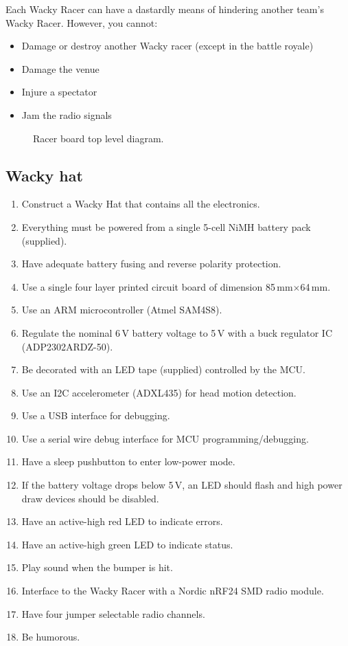 \documentclass[11pt, a4paper]{article}
\begin{document}
Each Wacky Racer can have a dastardly means of hindering another
team's Wacky Racer.  However, you cannot:
%
\begin{itemize}
\item Damage or destroy another Wacky racer (except in the battle royale)
\item Damage the venue
\item Injure a spectator
\item Jam the radio signals
\end{itemize}


\vspace{1cm}

\begin{figure}[h]
    \centering
    
    \caption{Racer board top level diagram.}
\end{figure}


\vfill\pagebreak

\subsection{Wacky hat}


\begin{enumerate}
\item Construct a Wacky Hat that contains all the electronics.
\item Everything must be powered from a single 5-cell NiMH battery pack (supplied).
\item Have adequate battery fusing and reverse polarity protection.
\item Use a single four layer printed circuit board of dimension 85\,mm$\times$64\,mm.
\item Use an ARM microcontroller (Atmel SAM4S8).
\item Regulate the nominal 6\,V battery voltage to 5\,V with a buck
  regulator IC (ADP2302ARDZ-50).
\item Be decorated with an LED tape (supplied) controlled by the MCU.
\item Use an I2C accelerometer (ADXL435) for head motion detection.
\item Use a USB interface for debugging.
\item Use a serial wire debug interface for MCU programming/debugging.
\item Have a sleep pushbutton to enter low-power mode.
\item If the battery voltage drops below 5\,V, an LED should flash and high power draw devices should be disabled.
\item Have an active-high red LED to indicate errors.
\item Have an active-high green LED to indicate status.
\item Play sound when the bumper is hit.
\item Interface to the Wacky Racer with a Nordic nRF24 SMD radio module.
\item Have four jumper selectable radio channels.
\item Be humorous.
\end{enumerate}
\end{document}
